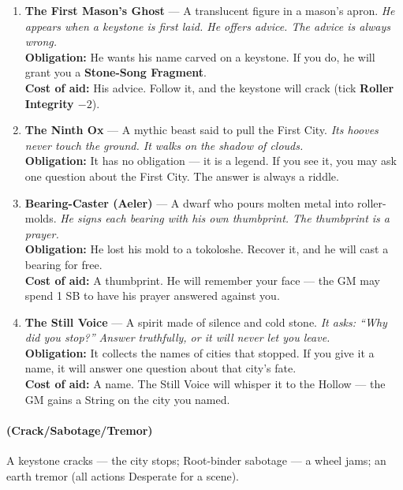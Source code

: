 \begin{enumerate}
\item[J] \textbf{The First Mason's Ghost} --- A translucent figure in a mason's apron.
  \hfill \textit{He appears when a keystone is first laid. He offers advice. The advice is always wrong.} \\
  \textbf{Obligation:} He wants his name carved on a keystone. If you do, he will grant you a \textbf{Stone-Song Fragment}. \\
  \textbf{Cost of aid:} His advice. Follow it, and the keystone will crack (tick \textbf{Roller Integrity $-2$}).

\item[Q] \textbf{The Ninth Ox} --- A mythic beast said to pull the First City.
  \hfill \textit{Its hooves never touch the ground. It walks on the shadow of clouds.} \\
  \textbf{Obligation:} It has no obligation --- it is a legend. If you see it, you may ask one question about the First City. The answer is always a riddle.

\item[K] \textbf{Bearing-Caster (Aeler)} --- A dwarf who pours molten metal into roller-molds.
  \hfill \textit{He signs each bearing with his own thumbprint. The thumbprint is a prayer.} \\
  \textbf{Obligation:} He lost his mold to a tokoloshe. Recover it, and he will cast a bearing for free. \\
  \textbf{Cost of aid:} A thumbprint. He will remember your face --- the GM may spend 1 SB to have his prayer answered against you.

\item[A] \textbf{The Still Voice} --- A spirit made of silence and cold stone.
  \hfill \textit{It asks: ``Why did you stop?'' Answer truthfully, or it will never let you leave.} \\
  \textbf{Obligation:} It collects the names of cities that stopped. If you give it a name, it will answer one question about that city's fate. \\
  \textbf{Cost of aid:} A name. The Still Voice will whisper it to the Hollow --- the GM gains a String on the city you named.
\end{enumerate}

\paragraph*{(Crack/Sabotage/Tremor)} A keystone cracks --- the city stops; Root-binder sabotage --- a wheel jams; an earth tremor (all actions Desperate for a scene).

